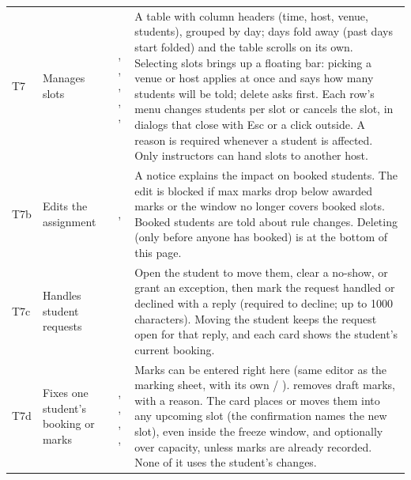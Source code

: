 {\begin{xltabular}{\linewidth}{@{}l P{34mm} P{30mm} L@{}}
  T7 & Manages slots & , , , , ,  & A table with column headers (time, host, venue, students), grouped by day; days fold away (past days start folded) and the table scrolls on its own. Selecting slots brings up a floating bar: picking a venue or host applies at once and says how many students will be told; delete asks first. Each row's menu changes students per slot or cancels the slot, in dialogs that close with Esc or a click outside. A reason is required whenever a student is affected. Only instructors can hand slots to another host.\\
  T7b & Edits the assignment & ,  & A notice explains the impact on booked students. The edit is blocked if max marks drop below awarded marks or the window no longer covers booked slots. Booked students are told about rule changes. Deleting (only before anyone has booked) is at the bottom of this page.\\
  T7c & Handles student requests &  & Open the student to move them, clear a no-show, or grant an exception, then mark the request handled or declined with a reply (required to decline; up to 1000 characters). Moving the student keeps the request open for that reply, and each card shows the student's current booking.\\
  T7d & Fixes one student's booking or marks & , , , ,  & Marks can be entered right here (same editor as the marking sheet, with its own  / ).  removes draft marks, with a reason. The  card places or moves them into any upcoming slot (the confirmation names the new slot), even inside the freeze window, and optionally over capacity, unless marks are already recorded. None of it uses the student's changes.\\

\end{xltabular}}
